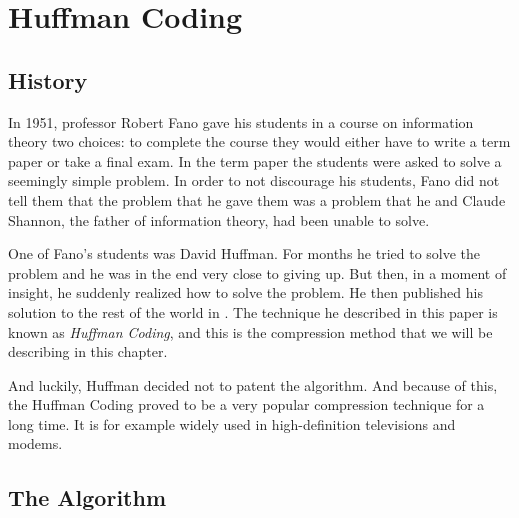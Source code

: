 \begin{comment}
  
\end{comment}


\chapter{Huffman Coding}
\label{cha:huffman}

\section{History}

In 1951, professor Robert Fano gave his students in a course on
information theory two choices: to complete the course they would
either have to write a term paper or take a final exam. In the term
paper the students were asked to solve a seemingly simple problem. In
order to not discourage his students, Fano did not tell them that the
problem that he gave them was a problem that he and Claude Shannon,
the father of information theory, had been unable to
solve\cite{stix91:_profil}.

One of Fano's students was David Huffman. For months he tried to solve
the problem and he was in the end very close to giving up. But then,
in a moment of insight, he suddenly realized how to solve the
problem. He then published his solution to the rest of the world in
\cite{huf52}. The technique he described in this paper is known as
\textit{Huffman Coding}, and this is the compression method that we
will be describing in this chapter.

And luckily, Huffman decided not to patent the algorithm. And because
of this, the Huffman Coding proved to be a very popular compression
technique for a long time. It is for example widely used in
high-definition televisions and modems.

\section{The Algorithm}

